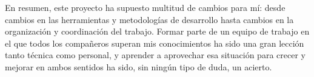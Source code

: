 En resumen, este proyecto ha supuesto multitud de cambios para mí: desde cambios en
las herramientas y metodologías de desarrollo hasta cambios en la organización y
coordinación del trabajo.  Formar parte de un equipo de trabajo en el que todos
los compañeros superan mis conocimientos ha sido una gran lección tanto técnica como
personal, y aprender a aprovechar esa situación para crecer y mejorar en ambos sentidos
ha sido, sin ningún tipo de duda, un acierto.